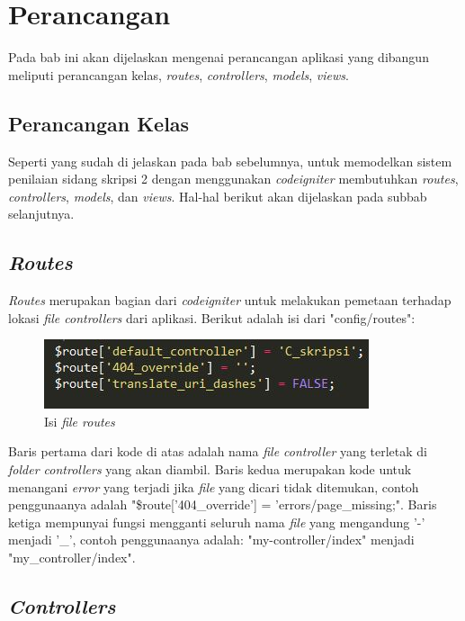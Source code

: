 \chapter{Perancangan}
\label{chap: perancangan}
	
	Pada bab ini akan dijelaskan mengenai perancangan aplikasi yang dibangun meliputi perancangan kelas, \textit{routes}, \textit{controllers}, \textit{models}, \textit{views}.
	
	\section{Perancangan Kelas}
	\label{sec: rancangKelas}
	
	Seperti yang sudah di jelaskan pada bab sebelumnya, untuk memodelkan sistem penilaian sidang skripsi 2 dengan menggunakan \textit{codeigniter} membutuhkan \textit{routes}, \textit{controllers}, \textit{models}, dan \textit{views}. Hal-hal berikut akan dijelaskan pada subbab selanjutnya.
	
	\section{\textit{Routes}}
	\label{sec: routes}
	
	\textit{Routes} merupakan bagian dari \textit{codeigniter} untuk melakukan pemetaan terhadap lokasi \textit{file controllers} dari aplikasi. Berikut adalah isi dari "config/routes":
	\begin{figure}[H]
		\centering
		\includegraphics[scale= 1.0]{Gambar/routes}
		\caption {Isi \textit{file routes}}
		\label{fig:routes}
	\end{figure}
	Baris pertama dari kode di atas adalah nama \textit{file controller} yang terletak di \textit{folder controllers} yang akan diambil. Baris kedua merupakan kode untuk menangani \textit{error} yang terjadi jika \textit{file} yang dicari tidak ditemukan, contoh penggunaanya adalah "\$route['404\_override'] = 'errors/page\_missing;". Baris ketiga mempunyai fungsi mengganti seluruh nama \textit{file} yang mengandung '-' menjadi '\_', contoh penggunaanya adalah: "my-controller/index"	menjadi "my\_controller/index".

	\section{\textit{Controllers}}
	\label{sec: controllers}
	
